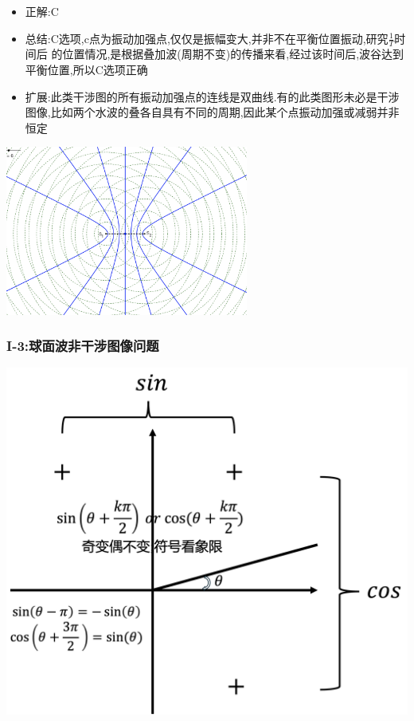 \documentclass{article}
\begin{document}
\begin{itemize}
    \item 正解:\quad C
    \item 总结:\quad C选项,c点为振动加强点,仅仅是振幅变大,并非不在平衡位置振动,研究$\frac{1}{T}$时间后
          的位置情况,是根据叠加波(周期不变)的传播来看,经过该时间后,波谷达到平衡位置,所以C选项正确
    \item 扩展:\quad 此类干涉图的所有振动加强点的连线是双曲线.有的此类图形未必是干涉图像,比如两个水波的叠各自具有不同的周期,因此某个点振动加强或减弱并非恒定
\end{itemize}

\begin{center}
    \includegraphics[width = 0.6\textwidth]{./pictures/2.1-2.png}
\end{center}

\vspace{2em}

\subsubsection{I-3:球面波非干涉图像问题}
\includegraphics[width = 50em]{./pictures/2.1-5.png}
\end{document}
